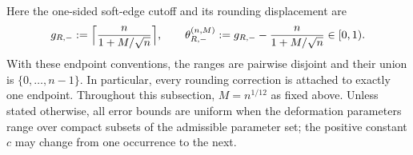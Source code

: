 \documentclass[a4paper]{article}
\newcommand{\C}{\mathbb{C}}
\numberwithin{equation}{section}
\begin{document}
Here the one-sided soft-edge cutoff and its rounding displacement are
\[
g_{R,-}:=\Bigl\lceil\frac{n}{1+M/\sqrt n}\Bigr\rceil,
\qquad
\theta_{R,-}^{(n,M)}:=g_{R,-}-\frac{n}{1+M/\sqrt n}\in[0,1).
\]
With these endpoint conventions, the ranges are pairwise disjoint and their
union is $\{0,\ldots,n-1\}$.  In particular, every
rounding correction is attached to exactly one endpoint.  Throughout this
subsection, $M=n^{1/12}$ as fixed above.  Unless stated otherwise, all error
bounds are uniform when the deformation parameters range over compact subsets
of the admissible parameter set; the positive constant $c$ may change from one
occurrence to the next.

\end{document}
